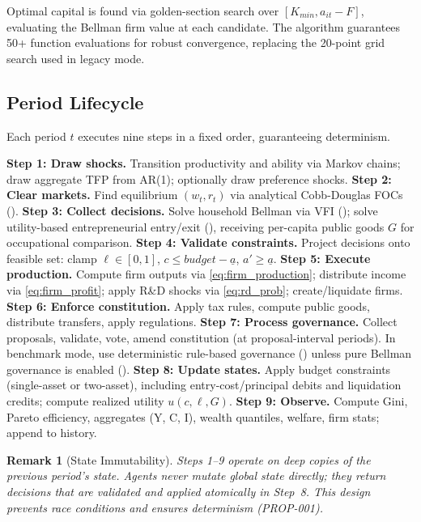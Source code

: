 \documentclass[12pt]{article}
\newtheorem{remark}{Remark}
\begin{document}
Optimal capital is found via golden-section search over $[K_{min}, a_{it} - F]$, evaluating the Bellman firm value at each candidate. The algorithm guarantees 50+ function evaluations for robust convergence, replacing the 20-point grid search used in legacy mode.


\subsection{Period Lifecycle}\label{sec:lifecycle}

Each period $t$ executes nine steps in a fixed order, guaranteeing determinism.

\begin{algorithm}[t]
\caption{Period Lifecycle (9-Step Algorithm)}\label{alg:lifecycle}
\textbf{Step 1: Draw shocks.} Transition productivity and ability via Markov chains; draw aggregate TFP from AR(1); optionally draw preference shocks.\;
\textbf{Step 2: Clear markets.} Find equilibrium $(w_t, r_t)$ via analytical Cobb-Douglas FOCs ().\;
\textbf{Step 3: Collect decisions.} Solve household Bellman via VFI (); solve utility-based entrepreneurial entry/exit (), receiving per-capita public goods $G$ for occupational comparison.\;
\textbf{Step 4: Validate constraints.} Project decisions onto feasible set: clamp $\ell \in [0,1]$, $c \leq budget - \underline{a}$, $a' \geq \underline{a}$.\;
\textbf{Step 5: Execute production.} Compute firm outputs via \eqref{eq:firm_production}; distribute income via \eqref{eq:firm_profit}; apply R\&D shocks via \eqref{eq:rd_prob}; create/liquidate firms.\;
\textbf{Step 6: Enforce constitution.} Apply tax rules, compute public goods, distribute transfers, apply regulations.\;
\textbf{Step 7: Process governance.} Collect proposals, validate, vote, amend constitution (at proposal-interval periods). In benchmark mode, use deterministic rule-based governance () unless pure Bellman governance is enabled ().\;
\textbf{Step 8: Update states.} Apply budget constraints (single-asset or two-asset), including entry-cost/principal debits and liquidation credits; compute realized utility $u(c, \ell, G)$.\;
\textbf{Step 9: Observe.} Compute Gini, Pareto efficiency, aggregates (Y, C, I), wealth quantiles, welfare, firm stats; append to history.\;
\end{algorithm}

\begin{remark}[State Immutability]
Steps 1--9 operate on deep copies of the previous period's state. Agents never mutate global state directly; they return decisions that are validated and applied atomically in Step~8. This design prevents race conditions and ensures determinism (PROP-001).
\end{remark}
\end{document}
